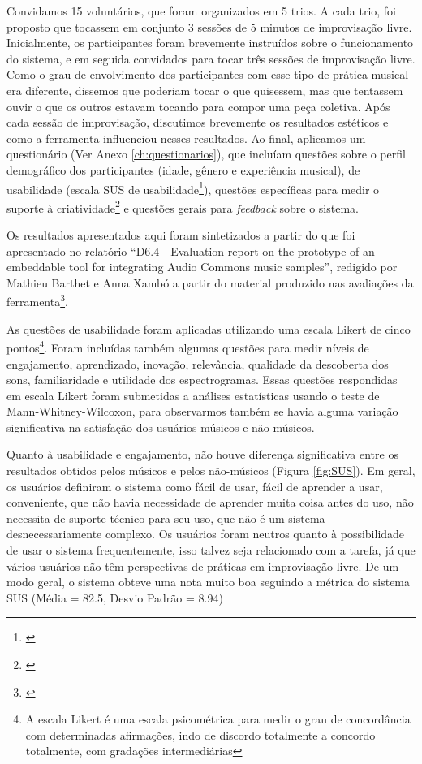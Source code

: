Convidamos 15 voluntários, que foram organizados em 5 trios. A cada trio, foi proposto que tocassem em conjunto 3 sessões de 5 minutos de improvisação livre. Inicialmente, os participantes foram brevemente instruídos sobre o funcionamento do sistema, e em seguida convidados para tocar três sessões de improvisação livre. Como o grau de envolvimento dos participantes com esse tipo de prática musical era diferente, dissemos que poderiam tocar o que quisessem, mas que tentassem ouvir o que os outros estavam tocando para compor uma peça coletiva. Após cada sessão de improvisação, discutimos brevemente os resultados estéticos e como a ferramenta influenciou nesses resultados. Ao final, aplicamos um questionário (Ver Anexo \ref{ch:questionarios}), que incluíam questões sobre o perfil demográfico dos participantes (idade, gênero e experiência musical), de usabilidade (escala SUS de usabilidade\footnote{\cite{Jordan1996}}), questões específicas para medir o suporte à criatividade\footnote{\cite{Cherry2014}} e questões gerais para \emph{feedback} sobre o sistema. 

Os resultados apresentados aqui foram sintetizados a partir do que foi apresentado no relatório ``D6.4 - Evaluation report on the prototype of an embeddable tool for integrating Audio Commons music samples'', redigido por Mathieu Barthet e Anna Xambó a partir do material produzido nas avaliações da ferramenta\footnote{\cite{Barthet2018}}.

As questões de usabilidade foram aplicadas utilizando uma escala Likert de cinco pontos\footnote{A escala Likert é uma escala psicométrica para medir o grau de concordância com determinadas afirmações, indo de discordo totalmente a concordo totalmente, com gradações intermediárias}. Foram incluídas também algumas questões para medir níveis de engajamento, aprendizado, inovação, relevância, qualidade da descoberta dos sons, familiaridade e utilidade dos espectrogramas. Essas questões respondidas em escala Likert foram submetidas a análises estatísticas usando o teste de Mann-Whitney-Wilcoxon, para observarmos também se havia alguma variação significativa na satisfação dos usuários músicos e não músicos.

Quanto à usabilidade e engajamento, não houve diferença significativa entre os resultados obtidos pelos músicos e pelos não-músicos (Figura \ref{fig:SUS}). Em geral, os usuários definiram o sistema como fácil de usar, fácil de aprender a usar, conveniente, que não havia necessidade de aprender muita coisa antes do uso, não necessita de suporte técnico para seu uso, que não é um sistema desnecessariamente complexo. Os usuários foram neutros quanto à possibilidade de usar o sistema frequentemente, isso talvez seja relacionado com a tarefa, já que vários usuários não têm perspectivas de práticas em improvisação livre. De um modo geral, o sistema obteve uma nota muito boa seguindo a métrica do sistema SUS (Média = 82.5, Desvio Padrão = 8.94)

